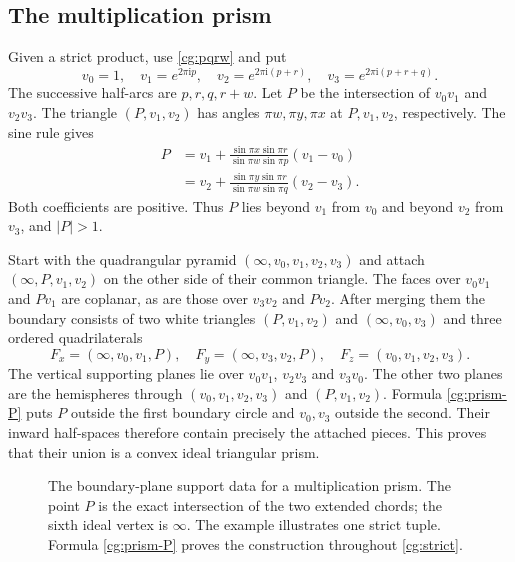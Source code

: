 \documentclass[11pt]{article}
\numberwithin{equation}{section}
\theoremstyle{definition}\newtheorem{definition}[theorem]{Definition}
\theoremstyle{remark}\newtheorem{remark}[theorem]{Remark}
\newcommand{\ii}{\mathrm i}
\begin{document}
\subsection{The multiplication prism}
Given a strict product, use \eqref{cg:pqrw} and put
\begin{equation}\label{cg:prism-vertices}
 v_0=1,\quad v_1=e^{2\pi\ii p},\quad
 v_2=e^{2\pi\ii(p+r)},\quad
 v_3=e^{2\pi\ii(p+r+q)} .
\end{equation}
The successive half-arcs are $p,r,q,r+w$. Let $P$ be the intersection
of $v_0v_1$ and $v_2v_3$. The triangle $(P,v_1,v_2)$ has
angles $\pi w,\pi y,\pi x$ at $P,v_1,v_2$, respectively.
The sine rule gives
\begin{equation}\label{cg:prism-P}
\begin{split}
 P&=v_1+\frac{\sin\pi x\sin\pi r}
                 {\sin\pi w\sin\pi p}(v_1-v_0)\\
  &=v_2+\frac{\sin\pi y\sin\pi r}
                 {\sin\pi w\sin\pi q}(v_2-v_3).
\end{split}
\end{equation}
Both coefficients are positive. Thus $P$ lies beyond $v_1$ from
$v_0$ and beyond $v_2$ from $v_3$, and $|P|>1$.

Start with the quadrangular pyramid
$(\infty,v_0,v_1,v_2,v_3)$ and attach
$(\infty,P,v_1,v_2)$ on the other side of their common triangle.
The faces over $v_0v_1$ and $Pv_1$ are coplanar, as are those over
$v_3v_2$ and $Pv_2$. After merging them the boundary consists of
two white triangles $(P,v_1,v_2)$ and $(\infty,v_0,v_3)$ and three
ordered quadrilaterals
\begin{equation}\label{cg:prism-faces}
 F_x=(\infty,v_0,v_1,P),\quad
 F_y=(\infty,v_3,v_2,P),\quad
 F_z=(v_0,v_1,v_2,v_3).
\end{equation}
The vertical supporting planes lie over $v_0v_1$, $v_2v_3$
and $v_3v_0$. The other two planes are the hemispheres through
$(v_0,v_1,v_2,v_3)$ and $(P,v_1,v_2)$. Formula
\eqref{cg:prism-P} puts $P$ outside the first boundary circle and
$v_0,v_3$ outside the second. Their inward half-spaces therefore
contain precisely the attached pieces. This proves that their union
is a convex ideal triangular prism.
\begin{figure}[ht]
\centering
\caption{The boundary-plane support data for a multiplication prism.
The point $P$ is the exact intersection of the two extended chords;
the sixth ideal vertex is $\infty$. The example illustrates one
strict tuple. Formula \eqref{cg:prism-P} proves the construction
throughout \eqref{cg:strict}.}
\label{cg:fig-prism}
\end{figure}
\end{document}
